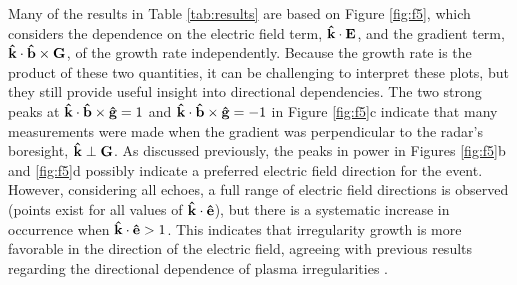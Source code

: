 Many of the results in Table \ref{tab:results} are based on Figure \ref{fig:f5}, which considers the dependence on the electric field term, \(\mathbf{\hat{k}}\cdot\mathbf{E}\), and the gradient term, \(\mathbf{\hat{k}}\cdot\mathbf{\hat{b}}\times\mathbf{G}\), of the growth rate independently.  Because the growth rate is the product of these two quantities, it can be challenging to interpret these plots, but they still provide useful insight into directional dependencies.  The two strong peaks at \(\mathbf{\hat{k}}\cdot\mathbf{\hat{b}}\times\mathbf{\hat{g}}=1\) and \(\mathbf{\hat{k}}\cdot\mathbf{\hat{b}}\times\mathbf{\hat{g}}=-1\) in Figure \ref{fig:f5}c indicate that many measurements were made when the gradient was perpendicular to the radar's boresight, \(\mathbf{\hat{k}}\perp\mathbf{G}\).  As discussed previously, the peaks in power in Figures \ref{fig:f5}b and \ref{fig:f5}d possibly indicate a preferred electric field direction for the event.  However, considering all echoes, a full range of electric field directions is observed (points exist for all values of \(\mathbf{\hat{k}}\cdot\mathbf{\hat{e}}\)), but there is a systematic increase in occurrence when \(\mathbf{\hat{k}}\cdot\mathbf{\hat{e}}>1\).  This indicates that irregularity growth is more favorable in the direction of the electric field, agreeing with previous results regarding the directional dependence of plasma irregularities \citep{Lamarche2016}.


